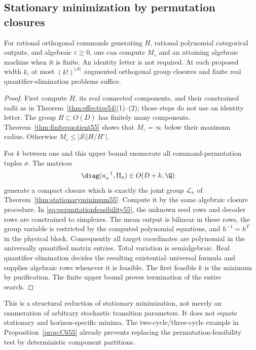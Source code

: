 \subsection{Stationary minimization by permutation closures}
\begin{theorem}\label{thm:effectivemin55}
For rational orthogonal commands generating $H$, rational polynomial categorical outputs, and algebraic $\varepsilon\ge0$, one can compute $M_\varepsilon$ and an attaining algebraic machine when it is finite. An identity letter is not required. At each proposed width $k$, at most $(k!)^{|\mathcal A|}$ augmented orthogonal group closures and finite real quantifier-elimination problems suffice.
\end{theorem}
\begin{proof}
First compute $H$, its real connected components, and their constrained radii as in Theorem~\ref{thm:effective54}(1)--(2); those steps do not use an identity letter. The group $H\subset O(D)$ has finitely many components. Theorem~\ref{thm:finitequotient55} shows that $M_\varepsilon=\infty$ below their maximum radius. Otherwise $M_\varepsilon\le |\mathcal S||H/H^\circ|$.

For $k$ between one and this upper bound enumerate all command-permutation tuples $\sigma$. The matrices
\[
                         \diag(u_a^{-1},\Pi_a)\in O(D+k,\Q)
\]
generate a compact closure which is exactly the joint group $\mathcal L_\sigma$ of Theorem~\ref{thm:stationaryminimum55}. Compute it by the same algebraic closure procedure. In \eqref{eq:permutationfeasibility55}, the unknown seed rows and decoder rows are constrained to simplexes. The mean output is bilinear in these rows, the group variable is restricted by the computed polynomial equations, and $h^{-1}=h^T$ in the physical block. Consequently all target coordinates are polynomial in the universally quantified matrix entries. Total variation is semialgebraic. Real quantifier elimination decides the resulting existential--universal formula and supplies algebraic rows whenever it is feasible. The first feasible $k$ is the minimum by purification. The finite upper bound proves termination of the entire search.
\end{proof}
This is a structural reduction of stationary minimization, not merely an enumeration of arbitrary stochastic transition parameters. It does not equate stationary and horizon-specific minima. The two-cycle/three-cycle example in Proposition~\ref{prop:C655} already prevents replacing the permutation-feasibility test by deterministic component partitions.

